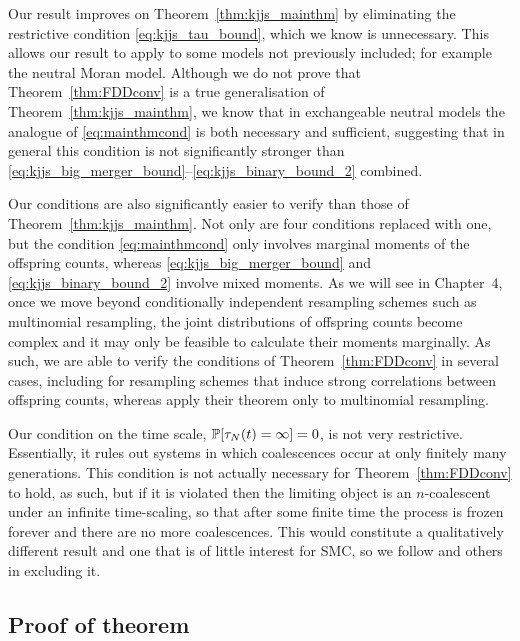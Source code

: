 Our result improves on Theorem~\ref{thm:kjjs_mainthm} by eliminating the restrictive condition \eqref{eq:kjjs_tau_bound}, which 
we know is unnecessary. This allows our result to apply to some models not previously included; for example the neutral Moran model. %
Although we do not prove that Theorem~\ref{thm:FDDconv} is a true generalisation of Theorem~\ref{thm:kjjs_mainthm},
we know that in exchangeable neutral models the analogue of \eqref{eq:mainthmcond} is both necessary and sufficient, suggesting that in general this condition is not significantly stronger than \eqref{eq:kjjs_big_merger_bound}--\eqref{eq:kjjs_binary_bound_2} combined.

Our conditions are also significantly easier to verify than those of Theorem~\ref{thm:kjjs_mainthm}. Not only are four conditions replaced with one, but the condition \eqref{eq:mainthmcond} only involves marginal moments of the offspring counts, whereas \eqref{eq:kjjs_big_merger_bound} and \eqref{eq:kjjs_binary_bound_2} involve mixed moments. 
As we will see in Chapter~4, once we move beyond conditionally independent resampling schemes such as multinomial resampling, the joint distributions of offspring counts become complex and it may only be feasible to calculate their moments marginally. 
As such, we are able to verify the conditions of Theorem~\ref{thm:FDDconv} in several cases, including for resampling schemes that induce strong correlations between offspring counts, whereas \textcite{koskela2018} apply their theorem only to multinomial resampling.

Our condition on the time scale, $\mathbb{P}[ \tau_N(t) = \infty ] =0$, is not very restrictive. Essentially, it rules out systems in which coalescences occur at only finitely many generations. 
This condition is not actually necessary for Theorem~\ref{thm:FDDconv} to hold, as such, but if it is violated then the limiting object is an $n$-coalescent under an infinite time-scaling, so that after some finite time the process is frozen forever and there are no more coalescences.
This would constitute a qualitatively different result and one that is of little interest for SMC, so we follow \textcite{mohle1998} and others in excluding it.


\subsection{Proof of theorem}
\label{sec:FDDproof}

